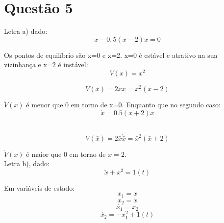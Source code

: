 \section{Questão 5}

Letra a) dado:\\

\begin{equation}
\dot{x} -0,5(x-2)x = 0
\end{equation}

\noindent Os pontos de equilíbrio são x=0 e x=2. x=0 é estável e atrativo na sua vizinhança e x=2 é instável:\\

\begin{equation}
V(x) = x^2
\end{equation}

\begin{equation}
\dot{V}(x) = 2x\dot{x} = x^2(x-2)
\end{equation}

\noindent $\dot{V}(x)$ é menor que 0 em torno de x=0. Enquanto que no segundo caso:\\

\begin{equation}
\dot{x} = 0.5(\bar{x}+2)\bar{x}
\end{equation}\

\begin{equation}
\dot{V}(\bar{x}) = 2\bar{x}\dot{\bar{x}} = \bar{x}^2(\bar{x}+2)
\end{equation}

\noindent $\dot{V}(x)$ é maior que 0 em torno de $x=2$.\\


Letra b), dado:\\

\begin{equation}
\ddot{x} + x^2 = 1(t)
\end{equation}

Em variáveis de estado:\\

\begin{equation}
x_1 = x
\end{equation}
\begin{equation}
x_2  = \dot{x}
\end{equation}
\begin{equation}
\dot{x_1} = x_2
\end{equation}
\begin{equation}
\dot{x_2} = -x_1^2+1(t)
\end{equation}

